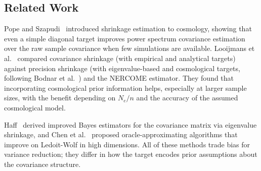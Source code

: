 \subsection{Related Work}
\label{sec:related}

Pope and Szapudi~\cite{pope2008shrinkage} introduced shrinkage estimation to cosmology, showing that even a simple diagonal target improves power spectrum covariance estimation over the raw sample covariance when few simulations are available. Looijmans et al.~\cite{looijmans2024comparison} compared covariance shrinkage (with empirical and analytical targets) against precision shrinkage (with eigenvalue-based and cosmological targets, following Bodnar et al.~\cite{bodnar2016direct}) and the NERCOME estimator. They found that incorporating cosmological prior information helps, especially at larger sample sizes, with the benefit depending on $N_e / n$ and the accuracy of the assumed cosmological model.

Haff~\cite{haff1991variational} derived improved Bayes estimators for the covariance matrix via eigenvalue shrinkage, and Chen et al.~\cite{chen2010shrinkage} proposed oracle-approximating algorithms that improve on Ledoit-Wolf in high dimensions. All of these methods trade bias for variance reduction; they differ in how the target encodes prior assumptions about the covariance structure.
